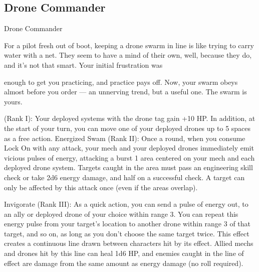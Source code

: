\subsection{Drone Commander}


                                           Drone Commander

For a pilot fresh out of boot, keeping a drone swarm in line is like trying to carry water with a net. They
seem to have a mind of their own, well, because they do, and it’s not that smart. Your initial frustration was

enough to get you practicing, and practice pays off. Now, your swarm obeys almost before you order — an
unnerving trend, but a useful one. The swarm is yours.

(Rank I): Your deployed systems with the drone tag gain +10 HP. In addition, at the start of your
turn, you can move one of your deployed drones up to 5 spaces as a free action.
Energized Swam (Rank II): Once a round, when you consume Lock On with any attack, your
mech and your deployed drones immediately emit vicious pulses of energy, attacking a burst 1
area centered on your mech and each deployed drone system. Targets caught in the area must
pass an engineering skill check or take 2d6 energy damage, and half on a successful check. A
target can only be affected by this attack once (even if the areas overlap).

Invigorate (Rank III): As a quick action, you can send a pulse of energy out, to an ally or
deployed drone of your choice within range 3. You can repeat this energy pulse from your
target’s location to another drone within range 3 of that target, and so on, as long as you don’t
choose the same target twice. This effect creates a continuous line drawn between characters hit
by its effect. Allied mechs and drones hit by this line can heal 1d6 HP, and enemies caught in the
line of effect are damage from the same amount as energy damage (no roll required).